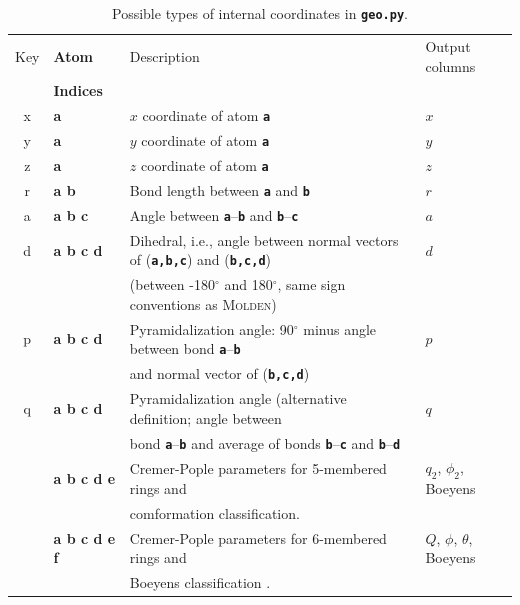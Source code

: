 \documentclass[a4paper,10pt,DIV=15,openany,twoside=false]{scrbook}
\newcommand{\ttt}[1]{\textbf{\texttt{#1}}}
\begin{document}
\begin{table}[htb]
  \centering
  \caption{Possible types of internal coordinates in \ttt{geo.py}. }
  \label{tab:Geo_input}
  \begin{tabular}{>{\ttfamily}c>{\bfseries\ttfamily}lll}
    \toprule
    \rmfamily Key         &\normalfont\rmfamily Atom      &Description    &Output columns\\
                          &\normalfont\rmfamily Indices   &               &\\
    \midrule
    x   &a              &$x$ coordinate of atom \ttt{a}                                         &$x$\\
    y   &a              &$y$ coordinate of atom \ttt{a}                                         &$y$\\
    z   &a              &$z$ coordinate of atom \ttt{a}                                         &$z$\\
    r   &a b            &Bond length between \ttt{a} and \ttt{b}                                &$r$\\
    a   &a b c          &Angle between \ttt{a}--\ttt{b} and \ttt{b}--\ttt{c}                    &$a$\\
    d   &a b c d        &Dihedral, i.e., angle between normal vectors of (\ttt{a,b,c}) and (\ttt{b,c,d})   &$d$\\
                       &&(between -180$^\circ$ and 180$^\circ$, same sign conventions as \textsc{Molden})\\
    p   &a b c d        &Pyramidalization angle: 90$^\circ$ minus angle between bond \ttt{a}--\ttt{b}   &$p$\\
                       &&and normal vector of (\ttt{b,c,d})&\\
    q   &a b c d        &Pyramidalization angle (alternative definition; angle between  &$q$\\
                       &&bond \ttt{a}--\ttt{b} and average of bonds \ttt{b}--\ttt{c} and \ttt{b}--\ttt{d}&\\
    5   &a b c d e      &Cremer-Pople parameters for 5-membered rings \cite{Cremer1975JACS} and&$q_2$, $\phi_2$, Boeyens\\
                       && comformation classification.&\\
    6   &a b c d e f    &Cremer-Pople parameters for 6-membered rings \cite{Cremer1975JACS} and&$Q$, $\phi$, $\theta$, Boeyens\\
                       &&Boeyens classification \cite{Boeyens1976JCMS}.&\\

\end{tabular}
\end{table}
\end{document}
